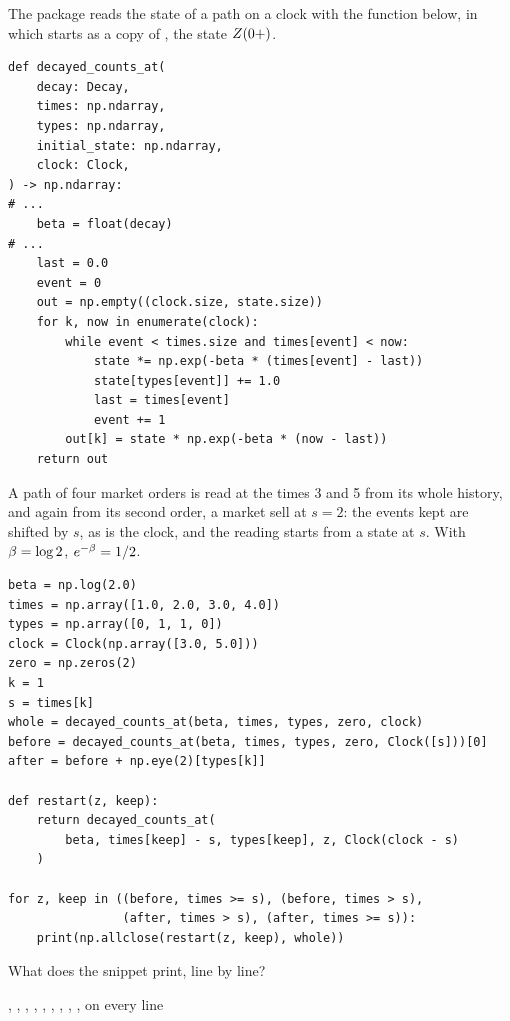 \begin{question}
\label{question.restartTheStateAfterAMarketSell}
The package reads the state of a path on a clock with the function below,
in which  starts as a copy of ,
the state $Z(0+)$.
\begin{lstlisting}[caption={\protect\codehl{unito26.lob.hawkes.decayed\_counts\_at}, abridged.}, label=listing.restartTheStateAfterAMarketSellQuote]
def decayed_counts_at(
    decay: Decay,
    times: np.ndarray,
    types: np.ndarray,
    initial_state: np.ndarray,
    clock: Clock,
) -> np.ndarray:
# ...
    beta = float(decay)
# ...
    last = 0.0
    event = 0
    out = np.empty((clock.size, state.size))
    for k, now in enumerate(clock):
        while event < times.size and times[event] < now:
            state *= np.exp(-beta * (times[event] - last))
            state[types[event]] += 1.0
            last = times[event]
            event += 1
        out[k] = state * np.exp(-beta * (now - last))
    return out
\end{lstlisting}
A path of four market orders is read at the times 3 and 5 from its whole history,
and again from its second order, a market sell at $s = 2$:
the events kept are shifted by $s$, as is the clock,
and the reading starts from a state  at $s$.
With $\beta = \log 2$, $e^{-\beta} = 1/2$.
\begin{lstlisting}[caption={Four restarts at a market sell}, label=listing.restartTheStateAfterAMarketSellRun]
beta = np.log(2.0)
times = np.array([1.0, 2.0, 3.0, 4.0])
types = np.array([0, 1, 1, 0])
clock = Clock(np.array([3.0, 5.0]))
zero = np.zeros(2)
k = 1
s = times[k]
whole = decayed_counts_at(beta, times, types, zero, clock)
before = decayed_counts_at(beta, times, types, zero, Clock([s]))[0]
after = before + np.eye(2)[types[k]]

def restart(z, keep):
    return decayed_counts_at(
        beta, times[keep] - s, types[keep], z, Clock(clock - s)
    )

for z, keep in ((before, times >= s), (before, times > s),
                (after, times > s), (after, times >= s)):
    print(np.allclose(restart(z, keep), whole))
\end{lstlisting}
What does the snippet print, line by line?
\begin{choices}
 \choice {}, , , 
 \choice {}, , , 
 \correctchoice {}, , , 
 \choice {} on every line
\end{choices}
\end{question}

